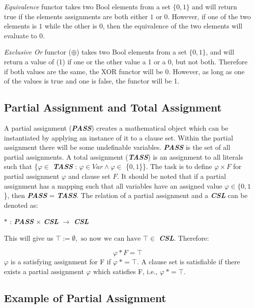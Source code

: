 \documentclass[11pt,a4paper, notitlepage]{report}
\begin{document}
\emph{Equivalence} functor takes two Bool elements from a set $\{0,1\}$ and will return true if the elements assignments are both either $1$ or $0$. However, if one of the two elements is $1$ while the other is $0$, then the equivalence of the two elements will evaluate to $0$.

\emph{Exclusive Or} functor ($\oplus$) takes two Bool elements from a set $\{0,1\}$, and will return a value of (1) if one or the other value a 1 or a 0, but not both. Therefore if both values are the same, the XOR functor will be 0. However, as long as one of the values is true and one is false, the functor will be 1. 

\subsection {Partial Assignment and Total Assignment}
\label{sec:pata}

A partial assignment (\textbf{\textit{PASS}}) creates a mathematical object which can be instantiated by applying an instance of it to a clause set. Within the partial assignment there will be some undefinable variables. \textbf{\textit{PASS}} is the set of all partial assignments.
A total assignment (\textbf{\textit{TASS}}) is an assignment to all literals such that \{$\varphi \in$ \textbf{\textit{TASS}} : $\varphi \in Var \land \varphi \in$ \{$0,1$\}\}. The task is to define $\varphi \times F$ for partial assignment $\varphi$ and clause set $F$. It should be noted that if a partial assignment has a mapping such that all variables have an assigned value $\varphi \in \{0,1$\}, then \textbf{\textit{PASS}} = \textbf{\textit{TASS}}.
The relation of a partial assignment and a \textbf{\textit{CSL}} can be denoted as:

\begin{center}
$\ast$ : \textbf{\textit{PASS}} $\times$ \textbf{\textit{CSL}} $\rightarrow$ \textbf{\textit{CSL}}
\end{center}
This will give us $\top:= \emptyset, \text{ so now we can have } \top \in$ \textbf{\textit{CSL}}. Therefore:

\begin{displaymath}
\varphi \ast F = \top
\end{displaymath}
$\varphi$ is a satisfying assignment for F if $\varphi \: \ast = \top$. A clause set is satisfiable if there exists a partial assignment $\varphi$ which satisfies F, i.e., $\varphi \: \ast = \top$.

\subsection{Example of Partial Assignment}
\label{subsec:ExamplePA}
\end{document}
